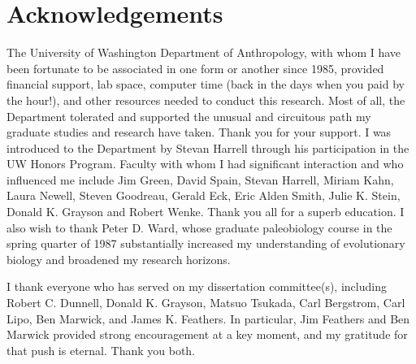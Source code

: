 





\renewcommand{\cftchapterfont}{\normalsize\normalfont}   
\renewcommand{\cftpartfont}{\normalsize\normalfont}   
\renewcommand{\cftsectionfont}{\normalsize\normalfont} 
\renewcommand{\cftsubsectionfont}{\normalsize\normalfont} 
\renewcommand*{\cftpartname}{Part\space}
\newpage
\setcounter{tocdepth}{3} 
\tableofcontents*
\cleardoublepage
\listoffigures
\cleardoublepage
\listoftables
\cleardoublepage



\clearpage
\chapter{Acknowledgements}

The University of Washington Department of Anthropology, with whom I have been fortunate to be associated in one form or another since 1985, provided financial support, lab space, computer time (back in the days when you paid by the hour!), and other resources needed to conduct this research.  Most of all, the Department tolerated and supported the unusual and circuitous path my graduate studies and research have taken.  Thank you for your support.  I was introduced to the Department by Stevan Harrell through his participation in the UW Honors Program.  Faculty with whom I had significant interaction and who influenced me include Jim Green, David Spain, Stevan Harrell, Miriam Kahn, Laura Newell, Steven Goodreau, Gerald Eck, Eric Alden Smith, Julie K. Stein, Donald K. Grayson and Robert Wenke.  Thank you all for a superb education.  I also wish to thank Peter D. Ward, whose graduate paleobiology course in the spring quarter of 1987 substantially increased my understanding of evolutionary biology and broadened my research horizons.  

\vskip 0.3cm

I thank everyone who has served on my dissertation committee(s), including Robert C. Dunnell, Donald K. Grayson, Matsuo Tsukada, Carl Bergstrom, Carl Lipo, Ben Marwick, and James K. Feathers.  In particular, Jim Feathers and Ben Marwick provided strong encouragement at a key moment, and my gratitude for that push is eternal.  Thank you both.


